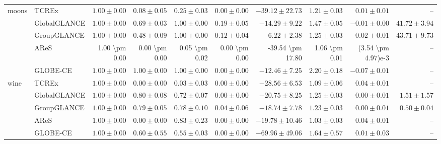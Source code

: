 \begin{table}[ht]
\begin{center}
\begin{sc}
\begin{scriptsize}
\begin{tabular}{l|l|rrrrrrrr}
\midrule
\multirow{5}{*}{moons} & TCREx & $\boldsymbol{1.00\pm{0.00}}$ & $0.08\pm{0.05}$ & $0.25\pm{0.03}$ & $0.00\pm{0.00}$ & $-39.12\pm{22.73}$ & $\boldsymbol{1.21\pm{0.03}}$ & $0.01\pm{0.01}$ & -- \\
 & GlobalGLANCE & $\boldsymbol{1.00\pm{0.00}}$ & $0.69\pm{0.03}$ & $\boldsymbol{1.00\pm{0.00}}$ & $\boldsymbol{0.19\pm{0.05}}$ & $-14.29\pm{9.22}$ & $1.47\pm{0.05}$ & $-0.01\pm{0.00}$ & $\boldsymbol{41.72\pm{3.94}}$ \\
 & GroupGLANCE & $\boldsymbol{1.00\pm{0.00}}$ & $0.48\pm{0.09}$ & $\boldsymbol{1.00\pm{0.00}}$ & $0.12\pm{0.04}$ & $\boldsymbol{-6.22\pm{2.38}}$ & $1.25\pm{0.03}$ & $\boldsymbol{0.02\pm{0.01}}$ & $43.71\pm{9.73}$ \\
 & AReS & 1.00 \textbackslash{}pm 0.00 & 0.00 \textbackslash{}pm 0.00 & 0.05 \textbackslash{}pm 0.02 & 0.00 \textbackslash{}pm 0.00 & -39.54 \textbackslash{}pm 17.80 & 1.06 \textbackslash{}pm 0.01 & (3.54 \textbackslash{}pm 4.97)e-3 & -- \\
 & GLOBE-CE & $\boldsymbol{1.00\pm{0.00}}$ & $\boldsymbol{1.00\pm{0.00}}$ & $\boldsymbol{1.00\pm{0.00}}$ & $0.00\pm{0.00}$ & $-12.46\pm{7.25}$ & $2.20\pm{0.18}$ & $-0.07\pm{0.01}$ & -- \\
\midrule
\multirow{5}{*}{wine} & TCREx & $\boldsymbol{1.00\pm{0.00}}$ & $0.00\pm{0.00}$ & $0.03\pm{0.03}$ & $0.00\pm{0.00}$ & $-28.56\pm{6.53}$ & $1.09\pm{0.06}$ & $\boldsymbol{0.04\pm{0.01}}$ & -- \\
 & GlobalGLANCE & $\boldsymbol{1.00\pm{0.00}}$ & $\boldsymbol{0.80\pm{0.08}}$ & $0.72\pm{0.07}$ & $0.00\pm{0.00}$ & $-20.75\pm{8.25}$ & $1.25\pm{0.03}$ & $0.00\pm{0.01}$ & $1.51\pm{1.57}$ \\
 & GroupGLANCE & $\boldsymbol{1.00\pm{0.00}}$ & $0.79\pm{0.05}$ & $0.78\pm{0.10}$ & $\boldsymbol{0.04\pm{0.06}}$ & $\boldsymbol{-18.74\pm{7.78}}$ & $1.23\pm{0.03}$ & $0.00\pm{0.01}$ & $\boldsymbol{0.50\pm{0.04}}$ \\
 & AReS & $\boldsymbol{1.00\pm{0.00}}$ & $0.00\pm{0.00}$ & $\boldsymbol{0.83\pm{0.23}}$ & $0.00\pm{0.00}$ & $-19.78\pm{10.46}$ & $\boldsymbol{1.03\pm{0.03}}$ & $\boldsymbol{0.04\pm{0.01}}$ & -- \\
 & GLOBE-CE & $\boldsymbol{1.00\pm{0.00}}$ & $0.60\pm{0.55}$ & $0.55\pm{0.03}$ & $0.00\pm{0.00}$ & $-69.96\pm{49.06}$ & $1.64\pm{0.57}$ & $0.01\pm{0.03}$ & -- \\
\bottomrule
\end{tabular}
\end{scriptsize}
\end{sc}
\end{center}
\end{table}

